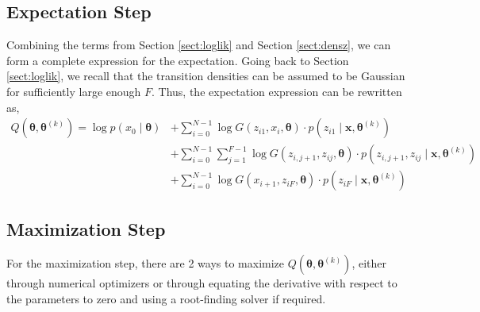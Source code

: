 \documentclass[12pt]{article}
\newcommand{\bx}{\ensuremath{\mathbf{x}}}
\newcommand{\btheta}{\ensuremath{\boldsymbol{\theta}}}
\begin{document}
\subsection{Expectation Step}
Combining the terms from Section \ref{sect:loglik} and Section \ref{sect:densz}, we can form a complete expression for the expectation. Going back to Section \ref{sect:loglik}, we recall that the transition densities can be assumed to be Gaussian for sufficiently large enough $F$. Thus, the expectation expression can be rewritten as,
\begin{align}
Q(\btheta, \btheta^{(k)}) = \log p(x_0 \mid \btheta) & + \sum_{i=0}^{N-1} \log G(z_{i1}, x_i, \btheta) \cdot p(z_{i1} \mid \bx, \btheta^{(k)}) \nonumber \\
& + \sum_{i=0}^{N-1} \sum_{j=1}^{F-1} \log G(z_{i,j+1}, z_{ij}, \btheta) \cdot p(z_{i,j+1}, z_{ij} \mid \bx, \btheta^{(k)}) \nonumber \\
& + \sum_{i=0}^{N-1} \log G(x_{i+1}, z_{iF}, \btheta) \cdot p(z_{iF} \mid \bx, \btheta^{(k)})
\end{align}

\subsection{Maximization Step}
For the maximization step, there are 2 ways to maximize $Q(\btheta, \btheta^{(k)})$, either through numerical optimizers or through equating the derivative with respect to the parameters to zero and using a root-finding solver if required.
\end{document}
